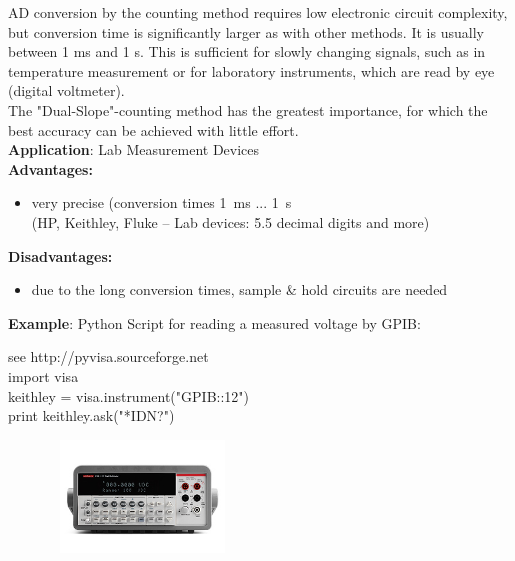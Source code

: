 AD conversion by the counting method requires low electronic circuit complexity, but conversion time is significantly larger as with other methods. It is usually between 1 ms and 1 s. This is sufficient for slowly changing signals, such as in temperature measurement or for laboratory instruments, which are read by eye (digital voltmeter). \\

The "Dual-Slope"-counting method has the greatest importance, for which the best accuracy can be achieved with little effort.\\

\textbf{Application}: Lab Measurement Devices\\

\textbf{Advantages:  }

\begin{itemize}
\item very precise (conversion times 1~ms ... 1~s \\
(HP, Keithley, Fluke -- Lab devices: 5.5 decimal digits and more)
\end{itemize}

\textbf{Disadvantages:  }

\begin{itemize}
\item due to the long conversion times, sample \& hold circuits are needed
\end{itemize}

\textbf{Example}: Python Script for reading a measured voltage by GPIB:

\begin{tcolorbox}[colback=blue!5!white,colframe=blue!75!black]
see http://pyvisa.sourceforge.net\\
import visa\\
keithley = visa.instrument("GPIB::12")\\
print keithley.ask("*IDN?") 
\end{tcolorbox}

    \begin{figure}[h]
    \centering
    \includegraphics[width=5cm, height=3cm]{Images/image40.png}
    \label{fig:Fig 133}
    \end{figure}
\newpage

